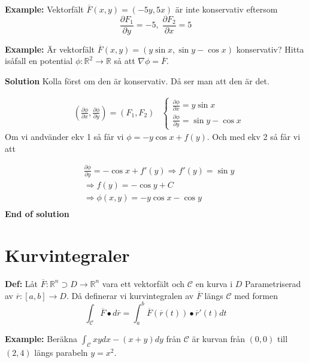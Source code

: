 \textbf{Example:}
Vektorfält $\overline{F}(x,y) = (-5y, 5x)$ är inte konservativ eftersom
\begin{equation*}
    \frac{\partial F_1}{\partial y} = -5,\; \frac{\partial F_2}{\partial x} = 5
\end{equation*}

\textbf{Example:}
Är vektorfält $\overline{F}(x,y) = (y\sin x, \sin y - \cos x)$ konservativ? 
Hitta isåfall en potential $\phi:\mathbb{R}^2\to\mathbb{R}$ så att $\nabla \phi = \overline{F}$.

\textbf{Solution}
Kolla först om den är konservativ. Då ser man att den är det.


\begin{align*}
    &\left(\frac{\partial \phi}{\partial x}, \frac{\partial \phi}{\partial y} \right) = (F_1, F_2)
    &\begin{cases}
        \frac{\partial \phi}{\partial x} = y\sin x \\
        \frac{\partial \phi}{\partial y} = \sin y - \cos x
    \end{cases}
\end{align*}
Om vi andvänder ekv 1 så får vi $\phi = -y\cos x + f(y)$.
Och med ekv 2 så får vi att 

\begin{align*}
    &\frac{\partial \phi}{\partial y} = -\cos x + f'(y) \Rightarrow f'(y) = \sin y \\
    &\Rightarrow f(y) = -\cos y + C \\
    &\Rightarrow \phi(x,y) = -y\cos x - \cos y \\
\end{align*}
\textbf{End of solution}



\section{Kurvintegraler}
\textbf{Def:} Låt $\overline{F}:\mathbb{R}^n \supset D\to\mathbb{R}^n$ vara ett
vektorfält och $\mathcal{C}$ en kurva i $D$ Parametriserad av $\overline{r}:[a,b]\to D$.
Då definerar vi kurvintegralen av $\overline{F}$ längs $\mathcal{C}$ med formen
\begin{equation*}
    \int_{\mathcal{C}} \overline{F} \bullet d\overline{r} = \int^{b}_{a} \overline{F}(\overline{r}(t)) \bullet \overline{r}'(t)dt
\end{equation*}

\textbf{Example:} Beräkna $\int_{\mathcal{C}} xydx - (x+y)dy$ från $\mathcal{C}$
är kurvan från $(0,0)$ till $(2,4)$ längs parabeln $y=x^2$.

